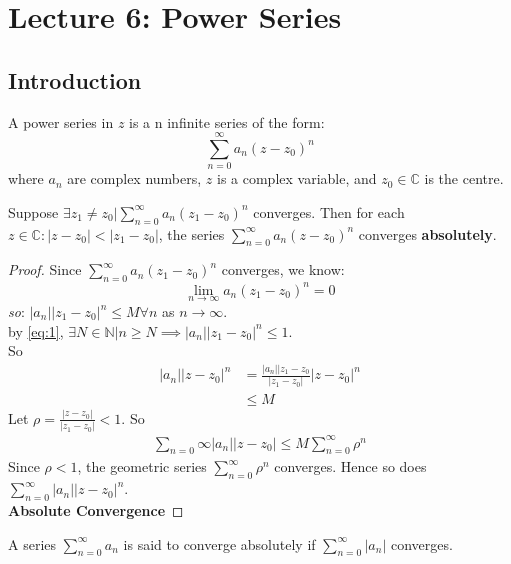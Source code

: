 \chapter{Lecture 6: Power Series}

\section{Introduction}
\begin{definition}
    A power series in $z$ is a n infinite series of the form:
    $$\sum_{n=0}^{\infty} a_n (z-z_0)^n$$
    where $a_n$ are complex numbers, $z$ is a complex variable, and $z_0 \in \mathbb{C}$ is the centre.
\end{definition}

\begin{theorem}
    Suppose $\exists z_1 \neq z_0 | \sum_{n=0}^{\infty} a_n (z_1-z_0)^n$ converges. Then for each $z \in \mathbb{C} : |z-z_0| < |z_1 - z_0|$, the series $\sum_{n=0}^{\infty} a_n (z-z_0)^n$ converges \textbf{absolutely}.
\end{theorem}

\begin{proof}
    Since $\sum_{n=0}^{\infty} a_n (z_1-z_0)^n$ converges, we know:
    \begin{equation}\lim_{n \to \infty} a_n (z_1-z_0)^n = 0 \label{eq:1}\end{equation}
    \textit{so}: $|a_n| |z_1 - z_0|^n \leq M \forall n$ as $n \to \infty$.\\
    by \ref{eq:1}, $\exists N \in \mathbb{N} | n \geq N \implies |a_n| |z_1 - z_0|^n \leq 1$.\\
    So
    \begin{align*}
        |a_n| |z-z_0|^n & = \frac{|a_n||z_1 - z_0}{|z_1 - z_0|} |z-z_0|^n \\ & \leq M
    \end{align*}
    Let $\rho = \frac{|z-z_0|}{|z_1 - z_0|} < 1$. So
    \begin{align*}
        \sum_{n=0}{\infty} |a_n||z-z_0| \leq M \sum_{n =0}^{\infty}\rho^n
    \end{align*}
    Since $\rho < 1$, the geometric series $\sum_{n=0}^{\infty} \rho^n$ converges. Hence so does $\sum_{n=0}^{\infty} |a_n||z-z_0|^n$.\\
    \textbf{Absolute Convergence}
\end{proof}

\begin{definition}
    A series $\sum_{n=0}^{\infty} a_n$ is said to converge absolutely if $\sum_{n=0}^{\infty} |a_n|$ converges.
\end{definition}

